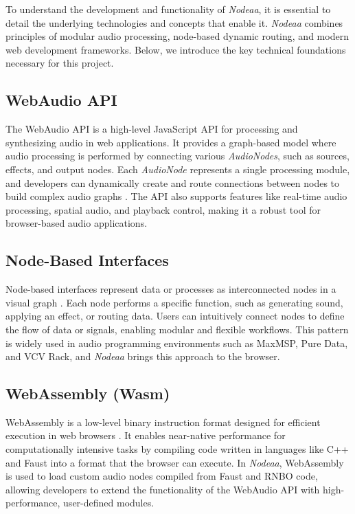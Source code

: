 \documentclass[10pt,twocolumn]{article}
\begin{document}
To understand the development and functionality of \textit{Nodeaa}, it is essential to detail the underlying technologies and concepts that enable it. \textit{Nodeaa} combines principles of modular audio processing, node-based dynamic routing, and modern web development frameworks. Below, we introduce the key technical foundations necessary for this project.

\subsection{WebAudio API}

The WebAudio API is a high-level JavaScript API for processing and synthesizing audio in web applications. It provides a graph-based model where audio processing is performed by connecting various \textit{AudioNodes}, such as sources, effects, and output nodes. Each \textit{AudioNode} represents a single processing module, and developers can dynamically create and route connections between nodes to build complex audio graphs \cite{smus2013web}. The API also supports features like real-time audio processing, spatial audio, and playback control, making it a robust tool for browser-based audio applications.

\subsection{Node-Based Interfaces}

Node-based interfaces represent data or processes as interconnected nodes in a visual graph \cite{burnett1995visual}. Each node performs a specific function, such as generating sound, applying an effect, or routing data. Users can intuitively connect nodes to define the flow of data or signals, enabling modular and flexible workflows. This pattern is widely used in audio programming environments such as MaxMSP, Pure Data, and VCV Rack, and \textit{Nodeaa} brings this approach to the browser.

\subsection{WebAssembly (Wasm)}

WebAssembly is a low-level binary instruction format designed for efficient execution in web browsers \cite{haas2017bringing}. It enables near-native performance for computationally intensive tasks by compiling code written in languages like C++ and Faust into a format that the browser can execute. In \textit{Nodeaa}, WebAssembly is used to load custom audio nodes compiled from Faust and RNBO code, allowing developers to extend the functionality of the WebAudio API with high-performance, user-defined modules.
\end{document}
